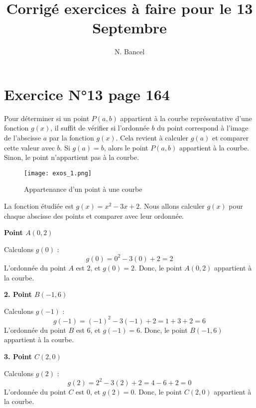 \documentclass[a4paper,12pt]{article}
\begin{document}
\title{Corrigé exercices à faire pour le 13 Septembre}
\author{N. Bancel}

\maketitle

\section*{Exercice N°13 page 164}

\begin{tcolorbox}[colback=yellow!10!white, colframe=yellow!50!black, title=Méthode pour vérifier l'appartenance d'un point à une courbe]
  Pour déterminer si un point \( P(a, b) \) appartient à la courbe représentative d'une fonction \( g(x) \), il suffit de vérifier si l'ordonnée \( b \) du point correspond à l'image de l'abscisse \( a \) par la fonction \( g(x) \). Cela revient à calculer \( g(a) \) et comparer cette valeur avec \( b \). Si \( g(a) = b \), alors le point \( P(a, b) \) appartient à la courbe. Sinon, le point n'appartient pas à la courbe.
  \end{tcolorbox}

\begin{figure}[H]
    \centering
    \texttt{[image: exos\_1.png]}
    \caption{\label{} Appartenance d'un point à une courbe}
  \end{figure}
  
  La fonction étudiée est \( g(x) = x^2 - 3x + 2 \). Nous allons calculer \( g(x) \) pour chaque abscisse des points et comparer avec leur ordonnée.
  
  \textbf{Point \( A(0, 2) \)} \par 
  Calculons \( g(0) \) :
  \[
  g(0) = 0^2 - 3(0) + 2 = 2
  \]
  L'ordonnée du point \( A \) est \( 2 \), et \( g(0) = 2 \). Donc, le point \( A(0, 2) \) appartient à la courbe.
  
  \textbf{2. Point \( B(-1, 6) \)} \par 
  Calculons \( g(-1) \) :
  \[
  g(-1) = (-1)^2 - 3(-1) + 2 = 1 + 3 + 2 = 6
  \]
  L'ordonnée du point \( B \) est \( 6 \), et \( g(-1) = 6 \). Donc, le point \( B(-1, 6) \) appartient à la courbe.
  
  \textbf{3. Point \( C(2, 0) \)} \par 
  Calculons \( g(2) \) :
  \[
  g(2) = 2^2 - 3(2) + 2 = 4 - 6 + 2 = 0
  \]
  L'ordonnée du point \( C \) est \( 0 \), et \( g(2) = 0 \). Donc, le point \( C(2, 0) \) appartient à la courbe.
  
\end{document}
